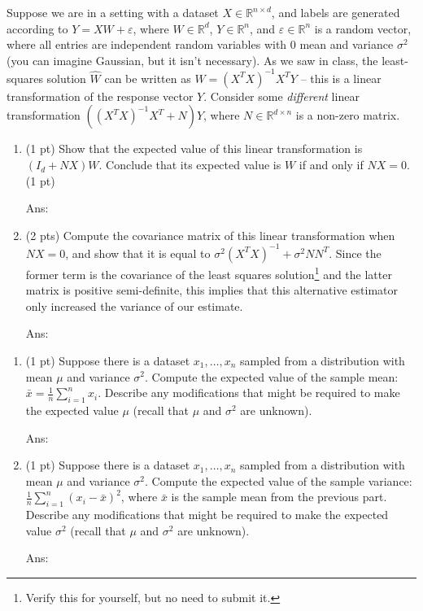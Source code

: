 \documentclass[10pt,letter,notitlepage]{article}
\newcommand{\ans}[1]{{\color{orange}\textsf{Ans}: #1}}
\newcounter{exercise}
\begin{document}
\begin{exercise}
Suppose we are in a setting with a dataset $X \in \mathbb{R}^{n \times d}$, and labels are generated according to $Y = XW + \varepsilon$, where $W \in \mathbb{R}^d$, $Y \in \mathbb{R}^n$, and $\varepsilon \in \mathbb{R}^n$ is a random vector, where all entries are independent random variables with $0$ mean and variance $\sigma^2$ (you can imagine Gaussian, but it isn't necessary).
    As we saw in class, the least-squares solution $\hat W$ can be written as $\hat W = (X^T X)^{-1}X^T Y$ -- this is a linear transformation of the response vector $Y$.
    Consider some \emph{different} linear transformation $\left((X^T X)^{-1}X^T + N\right)Y$, where $N \in \mathbb{R}^{d \times n}$ is a non-zero matrix.
\begin{enumerate}
  \item (1 pt) Show that the expected value of this linear transformation is $(I_d + NX)W$.
    Conclude that its expected value is $W$ if and only if $NX = 0$. (1 pt)

    \ans{} 
  \item (2 pts) Compute the covariance matrix of this linear transformation when $NX = 0$, and show that it is equal to $\sigma^2 (X^T X)^{-1} + \sigma^2 NN^T$.
    Since the former term is the covariance of the least squares solution\footnote{Verify this for yourself, but no need to submit it.} and the latter matrix is positive semi-definite, this implies that this alternative estimator only increased the variance of our estimate.

    \ans{} 
\end{enumerate}
\end{exercise}
\begin{exercise}
  \begin{enumerate}
  \item (1 pt) Suppose there is a dataset $x_1, \dots, x_n$ sampled from a distribution with mean $\mu$ and variance $\sigma^2$.
    Compute the expected value of the sample mean: $\bar x = \frac{1}{n} \sum_{i=1}^n x_i$. 
    Describe any modifications that might be required to make the expected value $\mu$ (recall that $\mu$ and $\sigma^2$ are unknown). 

    \ans{}
  \item (1 pt) Suppose there is a dataset $x_1, \dots, x_n$ sampled from a distribution with mean $\mu$ and variance $\sigma^2$.
    Compute the expected value of the sample variance: $\frac{1}{n} \sum_{i=1}^n \left(x_i - \bar x \right)^2$, where $\bar x$ is the sample mean from the previous part.
    Describe any modifications that might be required to make the expected value $\sigma^2$ (recall that $\mu$ and $\sigma^2$ are unknown). 
    
    \ans{} 
\end{enumerate}
\end{exercise}
\end{document}
